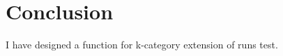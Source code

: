 \documentclass[12pt]{article}
\theoremstyle{plain}
\theoremstyle{definition}
\theoremstyle{remark}
\begin{document}
\section{Conclusion}
I have designed a function for k-category extension of runs test.
\end{document}

